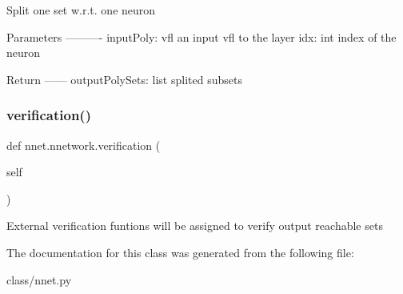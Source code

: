 \begin{DoxyVerb}Split one set w.r.t. one neuron

Parameters
----------
inputPoly: vfl
    an input vfl to the layer
idx: int
    index of the neuron

Return
------
outputPolySets: list
    splited subsets
\end{DoxyVerb}
 \mbox{\label{classnnet_1_1nnetwork_a228fd032b42053b8c8b3c5d9b6d6bdd0}} 
\subsubsection{\texorpdfstring{verification()}{verification()}}
{\footnotesize\ttfamily def nnet.\+nnetwork.\+verification (\begin{DoxyParamCaption}\item[{}]{self }\end{DoxyParamCaption})}

\begin{DoxyVerb}External verification funtions will be assigned to verify output reachable sets
\end{DoxyVerb}
 

The documentation for this class was generated from the following file\+:\begin{DoxyCompactItemize}
\item 
class/nnet.\+py\end{DoxyCompactItemize}
